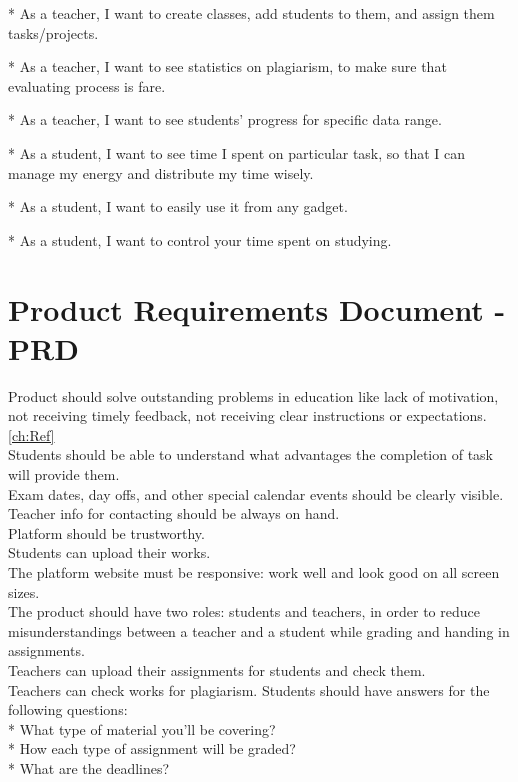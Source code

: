 * As a teacher, I want to create classes, add students to them, and assign them tasks/projects.

* As a teacher, I want to see statistics on plagiarism, to make sure that evaluating process is fare. 

* As a teacher, I want to see students' progress for specific data range. 

* As a student, I want to see time I spent on particular task, so that I can manage my energy and distribute my time wisely.

* As a student, I want to easily use it from any gadget.

* As a student, I want to control your time spent on  studying.
\section{Product Requirements Document - PRD} \label{sec:PRD}
Product should solve outstanding problems in education like lack of motivation, not receiving timely feedback, not receiving clear instructions or expectations. \cref{ch:Ref}\\
Students should be able to understand what advantages the completion of task will provide them. \\
Exam dates, day offs, and other special calendar events should be clearly visible.\\
Teacher info for contacting should be always on hand.\\
Platform should be trustworthy.\\
Students can upload their works.\\
The platform website must be responsive: work well and look good on all screen sizes.\\
The product should have two roles: students and teachers, in order to reduce misunderstandings between a teacher and a student while grading and handing in assignments.\\
Teachers can upload their assignments for students and check them. \\
Teachers can check works for plagiarism.
Students should have answers for the following questions:\\
* What type of material you’ll be covering?\\
* How each type of assignment will be graded?\\
* What are the deadlines?\\
